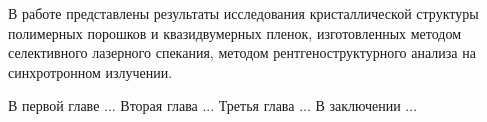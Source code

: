 

В работе представлены результаты исследования кристаллической структуры полимерных порошков и квазидвумерных пленок, изготовленных методом селективного лазерного спекания, методом рентгеноструктурного анализа на синхротронном излучении.


В первой главе ...
Вторая глава ...
Третья глава ...
В заключении ...

